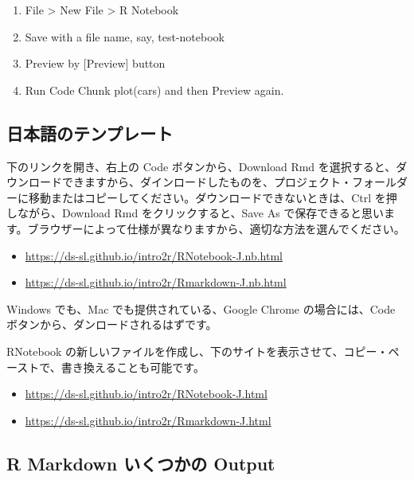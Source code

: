 \documentclass[
]{bxjsbook}
\providecommand{\tightlist}{%
  \setlength{\itemsep}{0pt}\setlength{\parskip}{0pt}}
\theoremstyle{definition}
\theoremstyle{definition}
\theoremstyle{definition}
\theoremstyle{definition}
\theoremstyle{remark}
\begin{document}
\begin{enumerate}
\def\labelenumi{\arabic{enumi}.}
\tightlist
\item
  File \textgreater{} New File \textgreater{} R Notebook
\item
  Save with a file name, say, test-notebook
\item
  Preview by {[}Preview{]} button
\item
  Run Code Chunk plot(cars) and then Preview again.
\end{enumerate}

\hypertarget{ux65e5ux672cux8a9eux306eux30c6ux30f3ux30d7ux30ecux30fcux30c8}{%
\subsection{日本語のテンプレート}\label{ux65e5ux672cux8a9eux306eux30c6ux30f3ux30d7ux30ecux30fcux30c8}}

下のリンクを開き、右上の Code ボタンから、Download Rmd を選択すると、ダウンロードできますから、ダインロードしたものを、プロジェクト・フォールダーに移動またはコピーしてください。ダウンロードできないときは、Ctrl を押しながら、Download Rmd をクリックすると、Save As で保存できると思います。ブラウザーによって仕様が異なりますから、適切な方法を選んでください。

\begin{itemize}
\tightlist
\item
  \url{https://ds-sl.github.io/intro2r/RNotebook-J.nb.html}
\item
  \url{https://ds-sl.github.io/intro2r/Rmarkdown-J.nb.html}
\end{itemize}

Windows でも、Mac でも提供されている、Google Chrome の場合には、Code ボタンから、ダンロードされるはずです。

RNotebook の新しいファイルを作成し、下のサイトを表示させて、コピー・ペーストで、書き換えることも可能です。

\begin{itemize}
\tightlist
\item
  \url{https://ds-sl.github.io/intro2r/RNotebook-J.html}
\item
  \url{https://ds-sl.github.io/intro2r/Rmarkdown-J.html}
\end{itemize}

\hypertarget{r-markdown-ux3044ux304fux3064ux304bux306e-output}{%
\subsection{R Markdown いくつかの Output}\label{r-markdown-ux3044ux304fux3064ux304bux306e-output}}
\end{document}
